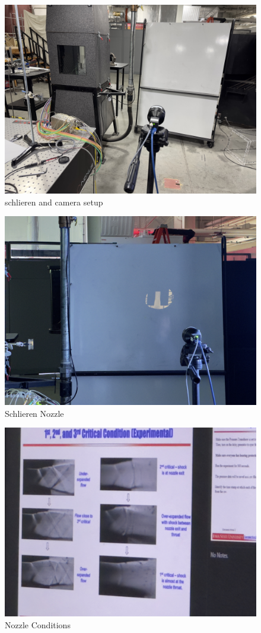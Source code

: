 \begin{figure}[htpb]
    \centering
    \includegraphics[width=0.75\linewidth]{Figures/schlieren_and_camera_setup.jpeg}
    \caption[schlieren and camera setup]{schlieren and camera setup}
    \label{fig: SchlierenAndCameraSetup}
\end{figure}

\begin{figure}[htpb]
    \centering
    \includegraphics[width=0.75\linewidth]{Figures/schlieren_nozzle.jpeg}
    \caption[Schlieren Nozzle]{Schlieren Nozzle}
    \label{fig: SchlierenNozzle}
\end{figure}

\begin{figure}[htpb]
    \centering
    \includegraphics[width=0.75\linewidth]{Figures/six_conditions.jpeg}
    \caption[Nozzle Conditions]{Nozzle Conditions}
    \label{fig: NozzleConditions}
\end{figure}

